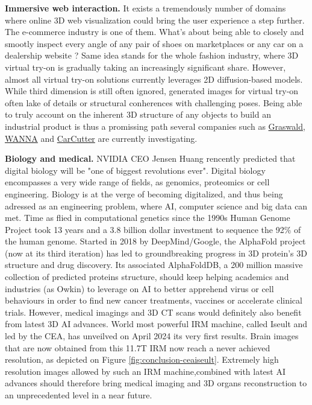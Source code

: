 \noindent \textbf{Immersive web interaction.} It exists a tremendously number of domains where online 3D web visualization could bring the user experience a step further. The e-commerce industry is one of them. What's about being able to closely and smootly inspect every angle of any pair of shoes on  marketplaces or any car on a dealership website ? Same idea stands for the whole fashion industry, where 3D virtual try-on is gradually taking an increasingly significant share. However, almost all virtual try-on solutions currently leverages 2D diffusion-based models. While third dimension is still often ignored, generated images for virtual try-on often lake of details or structural conherences with challenging poses. Being able to truly account on the inherent 3D structure of any objects to build an industrial product is thus a promissing path several companies such as \href{https://www.graswald.ai/}{Graswald}, \href{https://wanna.fashion/}{WANNA} and \href{https://www.car-cutter.com/}{CarCutter} are currently investigating. 

\noindent \textbf{Biology and medical.} NVIDIA CEO Jensen Huang rencently predicted that digital biology will be "one of biggest revolutions ever". Digital biology encompasses a very wide range of fields, as genomics, proteomics or cell engineering. Biology is at the verge of becoming digitalized, and thus being adressed as an engineering problem, where \ac{AI}, computer science and big data can met. Time as flied in computational genetics since the 1990s Human Genome Project took 13 years and a 3.8 billion dollar investment to sequence the 92\% of the human genome. Started in 2018 by DeepMind/Google, the AlphaFold project (now at its third iteration) has led to groundbreaking progress in 3D protein's 3D structure and drug discovery. Its associated AlphaFoldDB, a 200 million massive collection of predicted proteins structure, should keep helping academics and industries (as Owkin) to leverage on \ac{AI} to better apprehend virus or cell behaviours in order to find new cancer treatments, vaccines or accelerate clinical trials. However, medical imagings and 3D CT scans would definitely also benefit from latest 3D \ac{AI} advances. World most powerful IRM machine, called Iseult and led by the CEA, has unveilved on April 2024 its very first results. Brain images that are now obtained from this 11.7T IRM now reach a never achieved resolution, as depicted on Figure \ref{fig:conclusion-ceaiseult}. Extremely high resolution images allowed by such an IRM machine,combined with latest \ac{AI} advances should therefore bring medical imaging and 3D organs reconstruction to an unprecedented level in a near future. 

